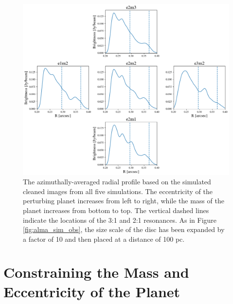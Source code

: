 \begin{figure}
    \includegraphics[width=\textwidth]{figures/grind/alma_profiles.png}
    \caption{The azimuthally-averaged radial profile based on the simulated cleaned images from all five simulations. The 
    eccentricity of the perturbing planet increases from left to right, while the mass of the planet increases from bottom to top. The 
    vertical dashed lines indicate the locations of the 3:1 and 2:1 resonances. As in Figure \ref{fig:alma_sim_obs}, the size scale of 
    the disc has been expanded by a factor of 10 and then placed at a distance of 100 pc.\label{fig:alma_profiles}}
\end{figure}

\section{Constraining the Mass and Eccentricity of the Planet}\label{sec:constrain}


